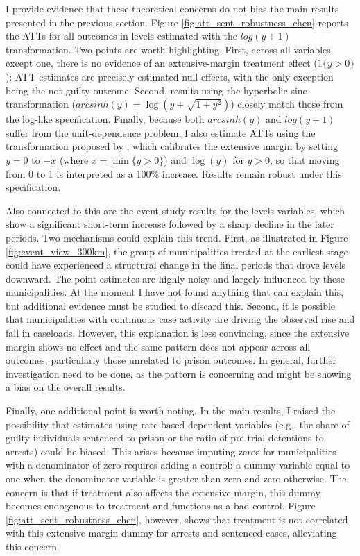I provide evidence that these theoretical concerns do not bias the main results presented in the previous section. Figure \ref{fig:att_sent_robustness_chen} reports the ATTs for all outcomes in levels estimated with the $log(y+1)$ transformation. Two points are worth highlighting. First, across all variables except one, there is no evidence of an extensive-margin treatment effect ($1\{y>0\}$): ATT estimates are precisely estimated null effects, with the only exception being the not-guilty outcome. Second, results using the hyperbolic sine transformation ($arcsinh(y) = \log(y + \sqrt{1 + y^2})$) closely match those from the log-like specification. Finally, because both $arcsinh(y)$ and $log(y+1)$ suffer from the unit-dependence problem, I also estimate ATTs using the transformation proposed by \cite{ChenRoth2024}, which calibrates the extensive margin by setting $y=0$ to $-x$ (where $x = \min\{y>0\}$) and $\log(y)$ for $y>0$, so that moving from 0 to 1 is interpreted as a 100\% increase. Results remain robust under this specification. 

Also connected to this are the event study results for the levels variables, which show a significant short-term increase followed by a sharp decline in the later periods. Two mechanisms could explain this trend. First, as illustrated in Figure \ref{fig:event_view_300km}, the group of municipalities treated at the earliest stage could have experienced a structural change in the final periods that drove levels downward. The point estimates are highly noisy and largely influenced by these municipalities. At the moment I have not found anything that can explain this, but additional evidence must be studied to discard this. Second, it is possible that municipalities with continuous case activity are driving the observed rise and fall in caseloads. However, this explanation is less convincing, since the extensive margin shows no effect and the same pattern does not appear across all outcomes, particularly those unrelated to prison outcomes. In general, further investigation need to be done, as the pattern is concerning and might be showing a bias on the overall results.

Finally, one additional point is worth noting. In the main results, I raised the possibility that estimates using rate-based dependent variables (e.g., the share of guilty individuals sentenced to prison or the ratio of pre-trial detentions to arrests) could be biased. This arises because imputing zeros for municipalities with a denominator of zero requires adding a control: a dummy variable equal to one when the denominator variable is greater than zero and zero otherwise. The concern is that if treatment also affects the extensive margin, this dummy becomes endogenous to treatment and functions as a bad control. Figure \ref{fig:att_sent_robustness_chen}, however, shows that treatment is not correlated with this extensive-margin dummy for arrests and sentenced cases, alleviating this concern.


